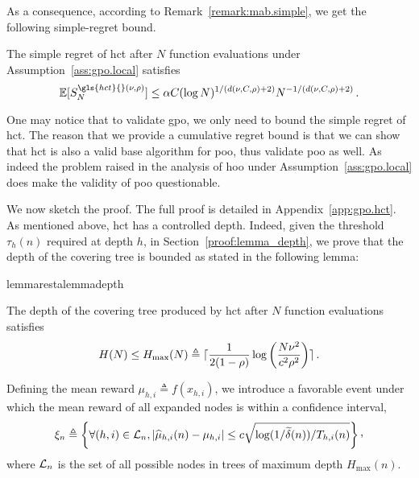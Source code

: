 As a consequence, according to Remark~\ref{remark:mab.simple}, we get the following simple-regret bound.
\begin{corollary}\label{cor:gpo.hct}
\begin{leftbar}[corollarybar]
The simple regret of \gls{hct} after $N$ function evaluations under Assumption~\ref{ass:gpo.local} satisfies
\[
	\mathbb{E}[S_N^{\gls{hct}{}(\nu,\rho)}] \leq \alpha C(\log N)^{1/(d(\nu,C,\rho)+2)}N^{-1/(d(\nu,C,\rho)+2)}\,.
\]
\end{leftbar}
\end{corollary}

\begin{remark}\label{remark:gpo.hct}
\begin{leftbar}[remarkbar]
One may notice that to validate \gls{gpo}, we only need to bound the simple regret of \gls{hct}. The reason that we provide a cumulative regret bound is that we can show that \gls{hct} is also a valid base algorithm for \gls{poo}, thus validate \gls{poo} as well. As indeed the problem raised in the analysis of \gls{hoo} under Assumption~\ref{ass:gpo.local} does make the validity of \gls{poo} questionable.
\end{leftbar}
\end{remark}

We now sketch the proof. The full proof is detailed in Appendix~\ref{app:gpo.hct}. As  mentioned above, \gls{hct} has a controlled depth. Indeed, given the threshold $\tau_h(n)$ required at depth $h$, in Section~\ref{proof:lemma_depth}, we prove that the depth of the covering tree is bounded as stated in the following lemma:
\begin{restatable}{lemma}{restalemmadepth}\label{lemma:gpo.depth}
\begin{leftbar}[lemmabar]
The depth of the covering tree produced by \gls{hct} after $N$ function evaluations satisfies 
\[
    H(N) \leq H_{\max}(N) \triangleq \lceil\frac{1}{2(1-\rho)} \log\left( \frac{N\nu^2}{c^2\rho^2} \right)\rceil\,.
\]
\end{leftbar}
\end{restatable}
\noindent
Defining the mean reward $\mu_{h,i} \triangleq f(x_{h,i})$, we introduce a favorable event under which the mean reward of all expanded nodes is within a confidence interval,
\[
	\xi_n \triangleq \left\{ \forall (h,i)\in\mathcal{L}_n,  |\hat{\mu}_{h,i}(n) - \mu_{h,i}| \leq c\sqrt{\operatorname{log}(1/\tilde{\delta}(n))/T_{h,i}(n)} \right\}\CommaBin
\]
where $\mathcal{L}_n$ is the set of all possible nodes in trees of maximum depth $H_{\max}(n)$.

